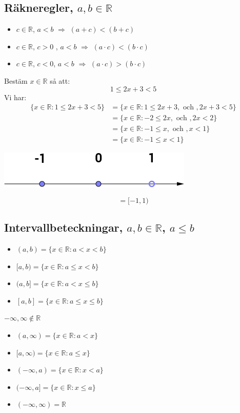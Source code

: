 \subsection{Räkneregler, $a, b \in \mathbb{R}$} %
\label{sub:r_kneregler_}
\begin{itemize}
    \item $c \in \mathbb{R}$, $a < b$ $\Rightarrow$ $(a + c) < (b + c)$
    \item $c \in \mathbb{R}$, $c > 0$ , $a < b$ $\Rightarrow$ $(a \cdot c) < (b \cdot c)$
    \item $c \in \mathbb{R}$, $c < 0$, $a < b$ $\Rightarrow$ $(a \cdot c) > (b \cdot c)$
\end{itemize}
\begin{Ex}
    Bestäm $x \in \mathbb{R}$ så att:
    \[
    1 \le 2x + 3 < 5
    \]
    Vi har:
    \begin{align*}
        \{x \in \mathbb{R}: 1 \le 2x + 3 < 5\} &= \{x \in \mathbb{R}: 1 \le 2x + 3, \mbox{ och }, 2x + 3 < 5\} \\
        &= \{x \in \mathbb{R}: -2 \le 2x, \mbox{ och }, 2x < 2\} \\
        &= \{x \in \mathbb{R}: -1 \le x, \mbox{ och }, x < 1\} \\
        &= \{x \in \mathbb{R}: -1 \le x < 1\}
    \end{align*}
    \begin{center}
        \includegraphics[scale=0.5]{exlinje.png}
    \end{center}
    \[
    = [-1, 1)
    \]
\end{Ex}
\subsection{Intervallbeteckningar,  $a,b \in \mathbb{R}$, $a \le b$} %
\label{sub:intervallbeteckningar_}
\begin{itemize}
    \item $(a, b) = \{x \in \mathbb{R}: a < x < b\}$
    \item $[a, b) = \{x \in \mathbb{R}: a \le x < b\}$
    \item $(a, b] = \{x \in \mathbb{R}: a < x \le b\}$
    \item $[a, b] = \{x \in \mathbb{R}: a \le x \le b\}$
\end{itemize}
$-\infty, \infty \notin \mathbb{R}$
\begin{itemize}
    \item $(a, \infty) = \{x \in \mathbb{R}: a < x\}$
    \item $[a, \infty) = \{x \in \mathbb{R}: a \le x\}$
    \item $(-\infty, a) = \{x \in \mathbb{R}: x < a\}$
    \item $(-\infty, a] = \{x \in \mathbb{R}: x \le a\}$
    \item $(-\infty, \infty) = \mathbb{R}$
\end{itemize}


